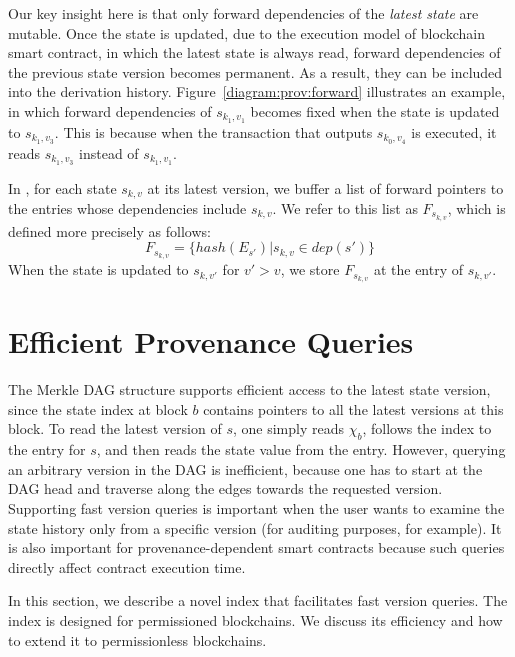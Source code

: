 Our key insight here is that only forward dependencies of the {\em latest state} are mutable. Once the state
is updated, due to the execution model of blockchain smart contract, in which the latest state is always read,
forward dependencies of the previous state version becomes permanent. As a result, they can be included into
the derivation history. Figure~\ref{diagram:prov:forward} illustrates an example, in which forward dependencies of
$s_{k_1, v_1}$ becomes fixed when the state is updated to $s_{k_1, v_3}$. This is because when the transaction
that
outputs $s_{k_0, v_4}$ is executed, it reads $s_{k_1, v_3}$ instead of $s_{k_1, v_1}$. 

In {\fs}, for each state $s_{k,v}$ at its latest version, we buffer a list of forward pointers to the
entries whose dependencies include $s_{k,v}$.  We refer to this list as $F_{s_{k,v}}$, which is defined more precisely as
follows: 
\begin{displaymath}
F_{s_{k,v}} = \{hash (E_{s'}) | s_{k,v} \in dep(s')\}
\end{displaymath}
\noindent When the state is updated to $s_{k,v'}$ for $v' > v$, we store $F_{s_{k,v}}$ at the entry of
$s_{k,v'}$.  

\section{Efficient Provenance Queries}
\label{prov:sec:index}
The Merkle DAG structure supports efficient access to the latest state version, since the state index at block
$b$ contains pointers to all the latest versions at this block. To read the latest version of $s$, one simply
reads $\chi_b$, follows the index to the entry for $s$, and then reads the state value from the entry.
However, querying an arbitrary version in the DAG is inefficient, because one has to start at the DAG head
and traverse along the edges towards the requested version.  Supporting fast version queries is important
when the user wants to examine the state history only from a specific version (for auditing purposes, for
example).  It is also important for provenance-dependent smart contracts because such queries directly affect
contract execution time. 

In this section, we describe a novel index that facilitates fast version queries. The index is designed for
permissioned blockchains. We discuss its efficiency and how to extend it to permissionless blockchains. 

